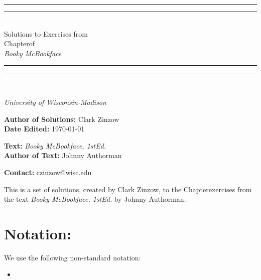 \documentclass[twoside, titlepage]{amsart}
\makeatletter
\newcommand{\authorName}{Clark Zinzow}  %
\newcommand{\bookName}{Booky McBookface}  %
\newcommand{\bookEdition}{1st}
\newcommand{\sectionType}{Chapter} %
\newcommand{\sectionNumber}{1} %
\newcommand{\startDate}{\today}
\newcommand{\bookAuthor}{Johnny Authorman}  %
\newcommand{\universityName}{University of Wisconsin-Madison}
\newcommand{\authorEmail}{czinzow@wisc.edu}  %
\theoremstyle{plain} %
\theoremstyle{definition}
\theoremstyle{remark}
\theoremstyle{notation}
\makeatother
\begin{document}
	
	\begin{titlepage}
		\centering
		\vspace*{\baselineskip}
		\rule{\textwidth}{1.6pt}\vspace*{-\baselineskip}\vspace*{2pt}
		\rule{\textwidth}{0.4pt}\\[\baselineskip]
		{\Huge Solutions to Exercises from \\ \sectionType \:\sectionNumber \:of \\[0.2\baselineskip] \emph{\bookName}
		}\\[0.2\baselineskip]
		\rule{\textwidth}{0.4pt}\vspace*{-\baselineskip}\vspace*{3pt}
		\rule{\textwidth}{1.6pt}\\[\baselineskip]
		\vspace*{3\baselineskip}
		\huge  \par
		\vspace*{\baselineskip}
		{\itshape \universityName \par}
		\vspace*{3\baselineskip}
		\huge \textbf{Author of Solutions:} { \authorName} \\
		\vspace*{\baselineskip}
		\huge \textbf{Date Edited:} { \startDate } \par
		\vspace*{\baselineskip}
		\huge \textbf{Text:} { \emph{\bookName,  \bookEdition \:Ed.}} \\
		\vspace*{\baselineskip}
		\huge \textbf{Author of Text:} { \bookAuthor } \par
		\vspace*{\baselineskip}
		\huge \textbf{Contact:} { \authorEmail } \\
	\end{titlepage}
	
	\makeatletter
	\providecommand\@dotsep{5}
	\makeatother
	\listoftodos\relax
	
	\clearpage
	
	This is a set of solutions, created by \authorName, to the \sectionType \:\sectionNumber \:exercises from the text \emph{\bookName, \bookEdition \:Ed.} by \bookAuthor.
	\hspace{0pt} \\
	
	\section*{Notation:}
	We use the following non-standard notation:
	\begin{itemize}
		\item 
	\end{itemize}
	
\end{document}
